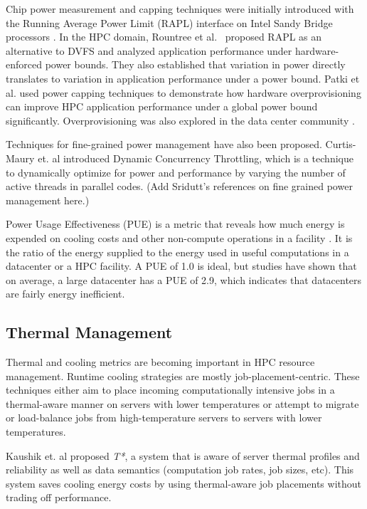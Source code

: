 Chip power measurement and capping techniques were initially introduced with the Running Average Power Limit (RAPL) interface on Intel Sandy Bridge processors \cite{IntelSDM,David2010}. In the HPC domain, Rountree et al.~\cite{Rountree2012} proposed RAPL as an alternative to DVFS and analyzed application performance under hardware-enforced power bounds. They also established that variation in power directly translates to variation in application performance under a power bound. Patki et al. \cite{Patki1} used power capping techniques to demonstrate how hardware overprovisioning can improve HPC application performance under a global power bound significantly. Overprovisioning was also explored in the data center community \cite{femal:04}. 

Techniques for fine-grained power management have also been proposed. Curtis-Maury et. al \cite{Curtis1,Curtis2,Curtis3} introduced Dynamic Concurrency Throttling, which is a technique to dynamically optimize for power and performance by varying the number of active threads in parallel codes. (Add Sridutt's references on fine grained power management here.)

Power Usage Effectiveness (PUE) is a metric that reveals how much energy is expended on cooling costs and other non-compute operations in a facility \cite{Niccolai}. It is the ratio of the energy supplied to the energy used in useful computations in a datacenter or a HPC facility. A PUE of 1.0 is ideal, but studies have shown that on average, a large datacenter has a PUE of 2.9, which indicates that datacenters are fairly energy inefficient. 

\subsection{Thermal Management}
Thermal and cooling metrics are becoming important in HPC resource management. Runtime cooling strategies are mostly job-placement-centric. These techniques either aim to place incoming computationally intensive jobs in a thermal-aware manner on servers with lower temperatures or attempt to migrate or load-balance jobs from high-temperature servers to servers with lower temperatures.

Kaushik et. al \cite{kaushik_t*:_2012} proposed \emph{T*}, a system that is aware of server thermal profiles and reliability as well as data semantics (computation job rates, job sizes, etc). This system saves cooling energy costs by using thermal-aware job placements without trading off performance.

